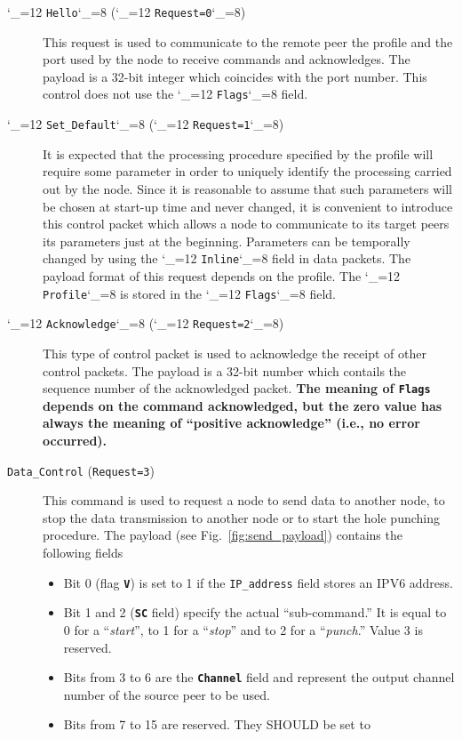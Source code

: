 \documentclass{rfc}
\newcommand{\ttbf}[1]{\texttt{\bfseries #1}}
\def\ttt{\catcode`\_=12 \tttii}
\def\tttii#1!{{\tt #1}\catcode`\_=8{}}
\begin{document}
\begin{description}
\item[\ttt Hello! (\ttt Request=0!)] This request is used to
  communicate to the remote peer the profile and the port used by
  the node to receive commands and acknowledges.  The payload is a
  32-bit integer which coincides with the port number.  This control
  does not use the \ttt Flags! field.
\item[\ttt Set\_Default! (\ttt Request=1!)] 
  It is expected that the processing procedure specified by the
  profile will require some parameter in order to uniquely identify
  the processing carried out by the node.   Since it is reasonable to
  assume that such parameters will be chosen at start-up time and
  never changed, it is convenient to introduce this control packet
  which allows a node to communicate to its target
  peers its parameters just at the beginning.  Parameters can be
  temporally changed by using the \ttt Inline! field in data packets.
  The payload format of this request depends on the profile. The \ttt
  Profile! is stored in the \ttt Flags! field.
\item[\ttt Acknowledge! (\ttt Request=2!)] This type of control packet is
  used to acknowledge the receipt of other control packets. The
  payload is a 32-bit number which contails the sequence number of the
  acknowledged packet.  \textbf{The meaning of \texttt{Flags} depends
  on the command 
  acknowledged, but the zero value has always the meaning of
  ``positive acknowledge'' (i.e., no error occurred).}
\item[\texttt{Data\_Control} (\texttt{Request=3})] This command is used to
  request a node to send data to another node, to stop the data
  transmission to another node or to start the hole punching
  procedure.  The payload (see Fig.~\ref{fig:send_payload}) contains the
  following fields
     \begin{itemize}
       \item Bit 0 (flag \ttbf{V}) is set to 1 if the \texttt{IP\_address}
       field stores an IPV6 address.
       \item Bit 1 and 2 (\ttbf{SC} field) specify the actual
       ``sub-command.''  It is equal to 0 for a ``\emph{start}'', to 1
       for a ``\emph{stop}'' and to 2 for a ``\emph{punch}.''  Value 3
       is reserved.
       \item Bits from 3 to 6 are the \ttbf{Channel} field and
       represent the output channel number of the source peer to be
       used. 
       \item Bits from 7 to 15 are reserved.  They SHOULD be set to

\end{itemize}
\end{description}
\end{document}

